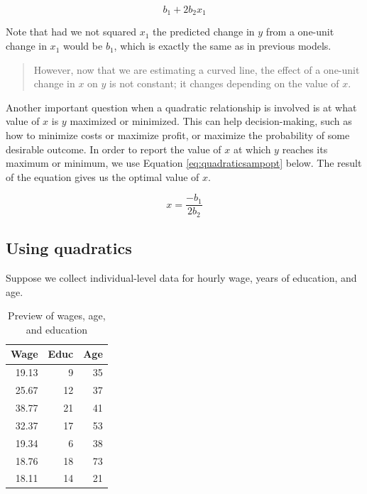\documentclass[
]{book}
\begin{document}
\begin{equation}
b_1 + 2b_2x_1
\label{eq:quadraticsampmarg}
\end{equation}

Note that had we not squared \(x_1\) the predicted change in \(y\) from a one-unit change in \(x_1\) would be \(b_1\), which is exactly the same as in previous models.

\begin{quote}
However, now that we are estimating a curved line, the effect of a one-unit change in \(x\) on \(y\) is not constant; it changes depending on the value of \(x\).
\end{quote}

Another important question when a quadratic relationship is involved is at what value of \(x\) is \(y\) maximized or minimized. This can help decision-making, such as how to minimize costs or maximize profit, or maximize the probability of some desirable outcome. In order to report the value of \(x\) at which \(y\) reaches its maximum or minimum, we use Equation \eqref{eq:quadraticsampopt} below. The result of the equation gives us the optimal value of \(x\).

\begin{equation}
x = {\frac{-b_1}{2b_2}}
\label{eq:quadraticsampopt}
\end{equation}

\hypertarget{using-quadratics}{%
\subsection{Using quadratics}\label{using-quadratics}}

Suppose we collect individual-level data for hourly wage, years of education, and age.

\begin{table}

\caption{\label{tab:wagestab}Preview of wages, age, and education}
\centering
\begin{tabular}[t]{r|r|r}
\hline
Wage & Educ & Age\\
\hline
19.13 & 9 & 35\\
\hline
25.67 & 12 & 37\\
\hline
38.77 & 21 & 41\\
\hline
32.37 & 17 & 53\\
\hline
19.34 & 6 & 38\\
\hline
18.76 & 18 & 73\\
\hline
18.11 & 14 & 21\\
\hline
\end{tabular}
\end{table}
\end{document}
